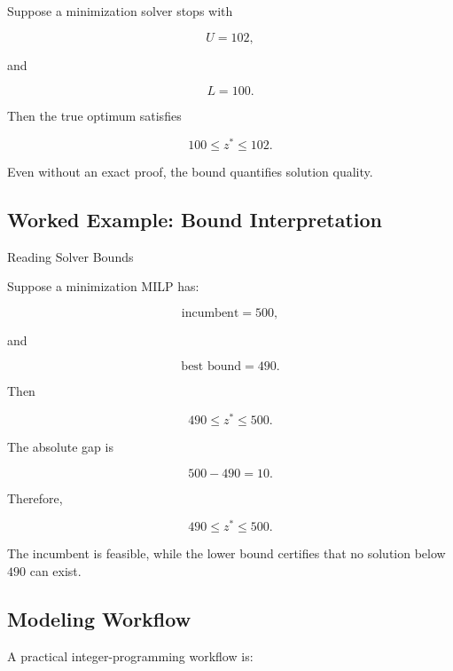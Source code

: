 Suppose a minimization solver stops with

\[
U=102,
\]

and

\[
L=100.
\]

Then the true optimum satisfies

\[
\boxed{
100
\leq
z^*
\leq
102.
}
\]

Even without an exact proof, the bound quantifies solution quality.

\subsection{Worked Example: Bound Interpretation}
\label{subsec:worked-mip-bound-interpretation}

\begin{workedexamplebox}{Reading Solver Bounds}

Suppose a minimization MILP has:

\[
\text{incumbent}=500,
\]

and

\[
\text{best bound}=490.
\]

Then

\[
490
\leq
z^*
\leq
500.
\]

The absolute gap is

\[
500-490=10.
\]

Therefore,

\begin{answerbox}
\[
\boxed{
490
\leq
z^*
\leq
500.
}
\]
\end{answerbox}

The incumbent is feasible, while the lower bound certifies that no
solution below \(490\) can exist.

\end{workedexamplebox}

\subsection{Modeling Workflow}
\label{subsec:integer-programming-workflow}

A practical integer-programming workflow is:

